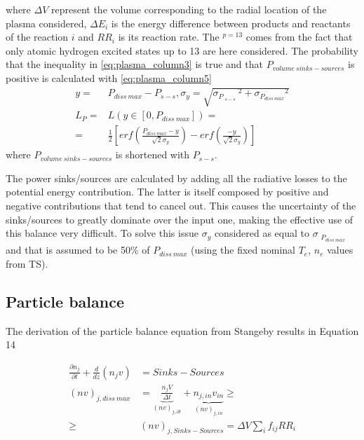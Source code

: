 where $\Delta V$ represent the volume corresponding to the radial location of the plasma considered, $\Delta E_i$ is the energy difference between products and reactants of the reaction $i$ and $RR_i$ is its reaction rate. The ${}^{p=13}$ comes from the fact that only atomic hydrogen excited states up to 13 are here considered. The probability that the inequality in \autoref{eq:plasma_column3} is true and that $P_{volume\ sinks-sources}$ is positive is calculated with \autoref{eq:plasma_column5}
\begin{equation}
\label{eq:plasma_column5}
\begin{aligned}
y =& P_{diss \: max} - P_{s-s}, \sigma_{y} = \sqrt{{\sigma_{P_{\substack{s-s}}}}^2 + {\sigma_{P_{diss \: max}}}^2 }
\\
L_P =& L(y \in [0,P_{diss \: max}]) = \\ =& \frac{1}{2} \left[ erf ( \frac{P_{diss \: max}-y}{ \sqrt{2} \sigma_{y} }) - erf(\frac{-y}{ \sqrt{2} \sigma_{y} } ) \right]
\end{aligned}
\end{equation}
where $P_{volume\ sinks-sources}$ is shortened with $P_{s-s}$.

The power sinks/sources are calculated by adding all the radiative losses to the potential energy contribution. The latter is itself composed by positive and negative contributions that tend to cancel out. This causes the uncertainty of the sinks/sources to greatly dominate over the input one, making the effective use of this balance very difficult. To solve this issue $\sigma_y$ considered as equal to $\sigma_{\substack{P_{diss \: max}}}$ and that is assumed to be 50\% of $P_{diss \: max}$ (using the fixed nominal $T_e$, $n_e$ values from TS). 


\subsection{Particle balance}\label{Particle balance}

The derivation of the particle balance equation from Stangeby\cite{Stangeby2001} results in Equation 14

\begin{equation}
\label{eq:plasma_column6}
\begin{aligned}
\frac{ \partial n_j}{ \partial t} + \frac{d}{dz}   \left(n_j v \right) &= Sinks-Sources \\ (nv)_{j, diss \: max} &={\underbrace{\frac{n_j V }{ \Delta t }}_{(nv)_{j,\partial t}} + \underbrace{n_{j,in} v_{in}}_{(nv)_{j,in}}} \geq \\ \geq & (nv)_{j, Sinks-Sources} = \Delta V \sum_{i} f_{ij} RR_i 
\end{aligned}
\end{equation}


